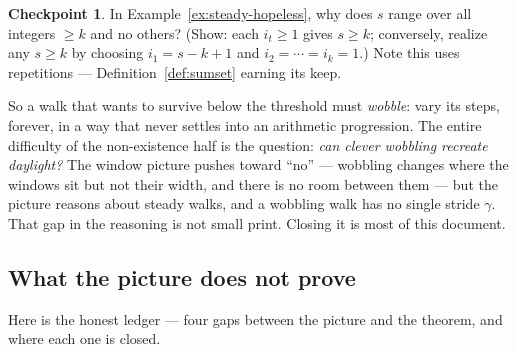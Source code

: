 \documentclass[11pt,reqno]{amsart}
\theoremstyle{plain}
\theoremstyle{definition}
\newtheorem{checkpoint}[theorem]{Checkpoint}   %
\theoremstyle{remark}
\begin{document}
\begin{checkpoint}
In Example~\ref{ex:steady-hopeless}, why does $s$ range over all integers $\ge k$ and
no others? (Show: each $i_t \ge 1$ gives $s \ge k$; conversely, realize any $s \ge k$
by choosing $i_1 = s - k + 1$ and $i_2 = \cdots = i_k = 1$.) Note this uses
repetitions --- Definition~\ref{def:sumset} earning its keep.
\end{checkpoint}

So a walk that wants to survive below the threshold must \emph{wobble}: vary its
steps, forever, in a way that never settles into an arithmetic progression. The entire
difficulty of the non-existence half is the question: \emph{can clever wobbling
recreate daylight?} The window picture pushes toward ``no'' --- wobbling changes where
the windows sit but not their width, and there is no room between them --- but the
picture reasons about steady walks, and a wobbling walk has no single stride $\gamma$.
That gap in the reasoning is not small print. Closing it is most of this document.

\subsection{What the picture does not prove}\label{sec:honest-list}

Here is the honest ledger --- four gaps between the picture and the theorem, and where
each one is closed.
\end{document}
